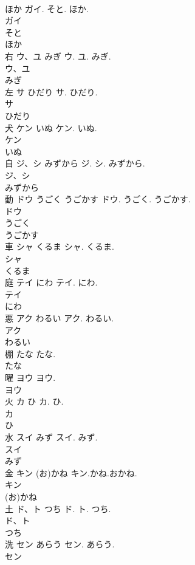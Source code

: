 \documentclass[8pt]{extreport}
\begin{document}
\begin{CJK}{UTF8}{min}
\\	ほか	ガイ. そと. ほか.	
\\	ガイ
\\	そと
\\	ほか
\\	右	ウ、ユ みぎ	ウ. ユ. みぎ.	
\\	ウ、ユ
\\	みぎ
\\	左	サ ひだり	サ. ひだり.	
\\	サ
\\	ひだり
\\	犬	ケン いぬ	ケン. いぬ.	
\\	ケン
\\	いぬ
\\	自	ジ、シ みずから	ジ. シ. みずから.	
\\	ジ、シ
\\	みずから
\\	動	ドウ うごく うごかす	ドウ. うごく. うごかす.	
\\	ドウ
\\	うごく
\\	うごかす
\\	車	シャ くるま	シャ. くるま.	
\\	シャ
\\	くるま
\\	庭	テイ にわ	テイ. にわ.	
\\	テイ
\\	にわ
\\	悪	アク わるい	アク. わるい.	
\\	アク
\\	わるい
\\	棚	たな	たな.	
\\	たな
\\	曜	ヨウ	ヨウ.	
\\	ヨウ
\\	火	カ ひ	カ. ひ.	
\\	カ
\\	ひ
\\	水	スイ みず	スイ. みず.	
\\	スイ
\\	みず
\\	金	キン (お)かね	キン.かね.おかね.	
\\	キン
\\	(お)かね
\\	土	ド、ト つち	ド. ト. つち.	
\\	ド、ト
\\	つち
\\	洗	セン あらう	セン. あらう.	
\\	セン

\end{CJK}
\end{document}
